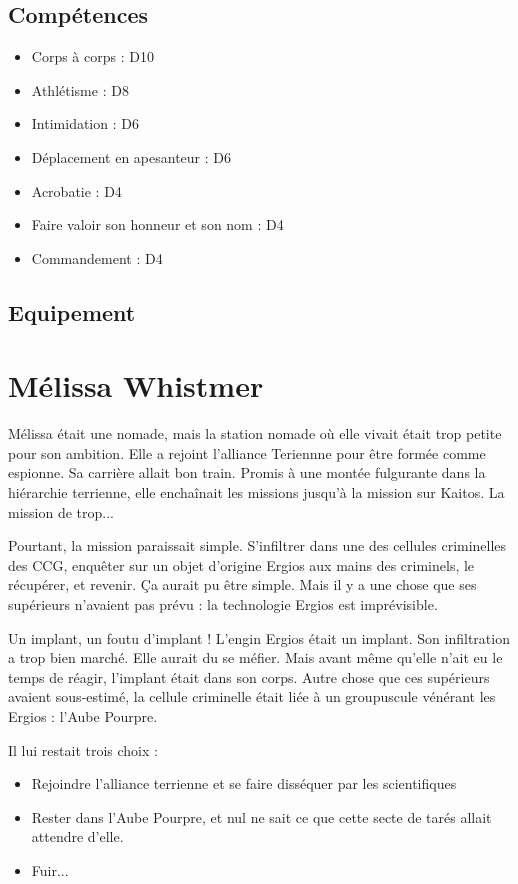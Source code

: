 \begin{multicols}{2}
\section*{Compétences}

\begin{itemize}
\item Corps à corps : D10
\item Athlétisme : D8
\item Intimidation : D6
\item Déplacement en apesanteur : D6
\item Acrobatie : D4
\item Faire valoir son honneur et son nom : D4
\item Commandement : D4
\end{itemize}

\section*{Equipement}

\end{multicols}

\clearpage

\chapter*{Mélissa Whistmer}

Mélissa était une nomade, mais la station nomade où elle vivait était trop petite pour son ambition. Elle a rejoint l'alliance Teriennne pour être formée comme espionne. Sa carrière allait bon train. Promis à une montée fulgurante dans la hiérarchie terrienne, elle enchaînait les missions jusqu'à la mission sur Kaitos. La mission de trop...

Pourtant, la mission paraissait simple. S'infiltrer dans une des cellules criminelles des CCG, enquêter sur un objet d'origine Ergios aux mains des criminels, le récupérer, et revenir. Ça aurait pu être simple. Mais il y a une chose que ses supérieurs n'avaient pas prévu : la technologie Ergios est imprévisible.

Un implant, un foutu d'implant ! L'engin Ergios était un implant. Son infiltration a trop bien marché. Elle aurait du se méfier. Mais avant même qu'elle n'ait eu le temps de réagir, l'implant était dans son corps. Autre chose que ces supérieurs avaient sous-estimé, la cellule criminelle était liée à un groupuscule vénérant les Ergios : l'Aube Pourpre.

Il lui restait trois choix :
\begin{itemize}
\item Rejoindre l'alliance terrienne et se faire disséquer par les scientifiques
\item Rester dans l'Aube Pourpre, et nul ne sait ce que cette secte de tarés allait attendre d'elle.
\item Fuir...
\end{itemize}


